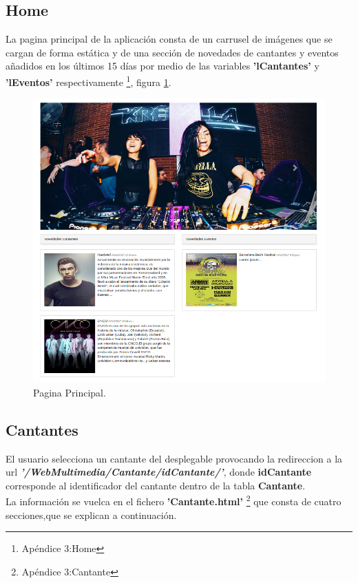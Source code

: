 \subsection{Home}
La pagina principal de la aplicación consta de un carrusel de imágenes que se cargan de forma estática y de una sección de novedades de cantantes y eventos añadidos en los últimos 15 días por medio de las variables \textbf{'lCantantes'} y \textbf{'lEventos'} respectivamente \footnote{Apéndice 3:Home}, figura \ref{fig:Page_Home}.
\begin{figure}[!h]
\begin{center}
   \includegraphics[width=0.5\linewidth]{Figures/HomePage}
	\decoRule
	\caption[Pagina Principal]{Pagina Principal.}
\label{fig:Page_Home}
\end{center}
\end{figure}
\subsection{Cantantes} 
El usuario selecciona un cantante del desplegable provocando la redireccion a la url \textit{\textbf{'/WebMultimedia/Cantante/idCantante/'}}, donde \textbf{idCantante} corresponde al identificador del cantante dentro de la tabla \textbf{Cantante}.
\\La información se vuelca en el fichero \textbf{'Cantante.html'} \footnote{Apéndice 3:Cantante} que consta de cuatro secciones,que se explican a continuación.
